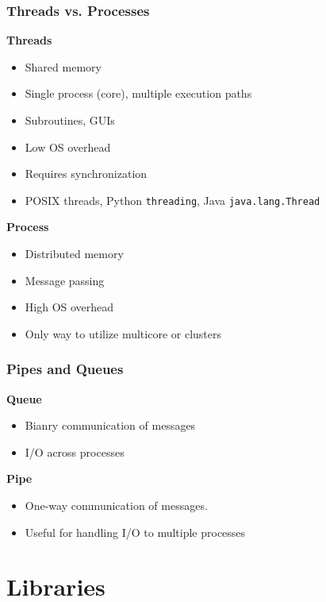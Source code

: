 \documentclass{beamer}
\begin{document}

\begin{frame}
\frametitle{Threads vs. Processes}
\textbf{Threads}
\begin{itemize}
  \item Shared memory
  \item Single process (core), multiple execution paths
  \item Subroutines, GUIs
  \item Low OS overhead
  \item Requires synchronization
  \item POSIX threads, Python \texttt{threading}, Java \texttt{java.lang.Thread}
\end{itemize}

\textbf{Process}
\begin{itemize}
  \item Distributed memory
  \item Message passing
  \item High OS overhead
  \item Only way to utilize multicore or clusters
\end{itemize}

\end{frame}

\begin{frame}
\frametitle{Pipes and Queues}
\textbf{Queue}
\begin{itemize}
  \item Bianry communication of messages
  \item I/O across processes
\end{itemize}

\pause

\textbf{Pipe}
\begin{itemize}
  \item One-way communication of messages. 
  \item Useful for handling I/O to multiple processes
\end{itemize}
\end{frame}



\section{Libraries}
\end{document}

